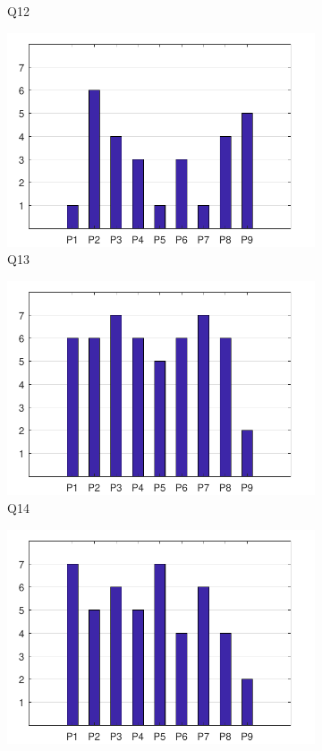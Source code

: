 \documentclass[english, 12pt, a4paper, pdftex, elec, utf8]{aaltothesis}
\begin{document}
\begin{figure}[h!]
\begin{subfigure}[b]{0.49\textwidth}
		\caption*{Q12}
	\end{subfigure}
	\begin{subfigure}[b]{0.49\textwidth}
		\includegraphics[width=\textwidth]{T2_4.pdf}
		\caption*{Q13}
	\end{subfigure}
	\begin{subfigure}[b]{0.49\textwidth}
		\includegraphics[width=\textwidth]{T2_5.pdf}
		\caption*{Q14}
	\end{subfigure}
	\begin{subfigure}[b]{0.49\textwidth}
		\includegraphics[width=\textwidth]{T2_6.pdf}

\end{subfigure}
\end{figure}
\end{document}
